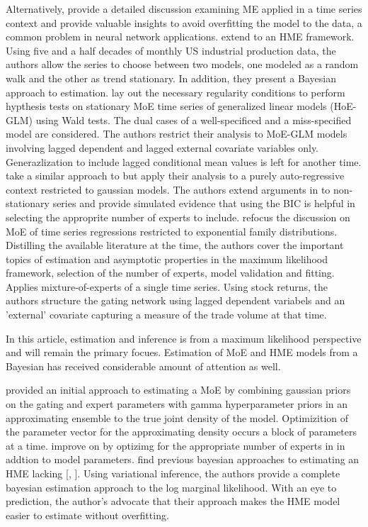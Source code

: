 \documentclass[12pt]{article}
\begin{document}
Alternatively, \cite{WMS1995} provide a detailed discussion 
examining ME applied in a time series context and provide valuable
insights to avoid overfitting the model to the data, a common problem in
neural network applications. \cite{HuertaJiangTanner2003} extend \cite{WMS1995} to an HME
framework. Using five and a half decades of monthly US industrial production
data, the authors allow the series to choose between two models, one modeled
as a random walk and the other as trend stationary. In addition, they present a
Bayesian approach to estimation. \cite{CarvalhoTanner2003} lay out the necessary regularity conditions to perform
hypthesis tests on stationary MoE time series of generalized linear models (HoE-GLM)
using Wald tests. The dual cases of a well-specificed and a miss-specified model
are considered. The authors restrict their analysis to MoE-GLM models involving
lagged dependent and lagged external covariate variables only. Generazlization to
include lagged conditional mean values is left for another time.
\cite{CarvalhoTanner2005} take a similar approach to \cite{CarvalhoTanner2003} but
apply their analysis to a purely auto-regressive context restricted to gaussian models.
The authors extend arguments in \cite{CarvalhoTanner2003} to non-stationary series and
provide simulated evidence that using the BIC is helpful in selecting the 
approprite number of experts to include. \cite{CarvalhoTanner2006} refocus the discussion on MoE of time series
regressions restricted to exponential family distributions. Distilling
the available literature at the time, the authors cover the important
topics of estimation and asymptotic properties in the maximum likelihood
framework, selection of the number of experts, model validation and
fitting. \cite{CarvalhoSkoulakis2010} Applies mixture-of-experts of a single time series.
Using stock returns, the authors structure the gating network using lagged
dependent variabels and an 'external' covariate capturing a measure of the
trade volume at that time.

In this article, estimation and inference is from a maximum likelihood 
perspective and will remain the primary focues. Estimation of MoE and HME
models from a Bayesian has received considerable amount of attention as well.

\cite{Waterhouse1995BayesianMF} provided an initial approach to estimating
a MoE by combining gaussian priors on the gating and expert parameters
with gamma hyperparameter priors in an approximating ensemble to the true
joint density of the model. Optimizition of the parameter vector for the approximating density
occurs a block of parameters at a time. \cite{UedaGhahramani2002} improve
on \cite{Waterhouse1995BayesianMF} by optizimg for the appropriate number of
experts in in addtion to  model parameters. \cite{BishopSvenson2003} find
previous bayesian approaches to estimating an HME lacking [\cite{HuertaJiangTanner2003},
\cite{UedaGhahramani2002}]. Using variational inference, the authors provide a
complete bayesian estimation approach to the log marginal likelihood. With an eye
to prediction, the author's advocate that their approach makes the HME model
easier to estimate without overfitting.
\end{document}
